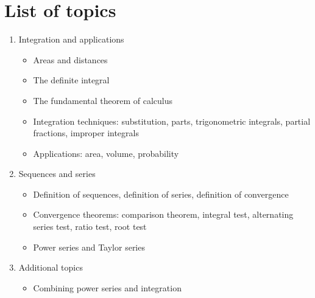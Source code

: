\documentclass[11pt,oneside]{amsart}
\begin{document}
\section{List of topics}
\begin{enumerate}
    \item Integration and applications
    \begin{itemize}
        \item Areas and distances
        \item The definite integral
        \item The fundamental theorem of calculus
        \item Integration techniques: substitution, parts, trigonometric integrals, partial fractions, improper integrals
        \item Applications: area, volume, probability
    \end{itemize}
    \item Sequences and series
    \begin{itemize}
        \item Definition of sequences, definition of series, definition of convergence
        \item Convergence theorems: comparison theorem, integral test, alternating series test, ratio test, root test
        \item Power series and Taylor series
    \end{itemize}
    \item Additional topics
    \begin{itemize}
        \item Combining power series and integration
    \end{itemize}
\end{enumerate}
\end{document}
